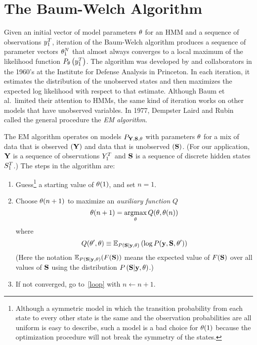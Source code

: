 \section{The Baum-Welch Algorithm}
\label{sec:baum_welch}

Given an initial vector of model parameters $\theta$ for an HMM
and a sequence of observations $y_{1}^{T}$, iteration of the
Baum-Welch algorithm  produces a
sequence of parameter vectors $\theta_{1}^{N}$ that almost
always converges to a local maximum of the likelihood function
$P_{\theta} \left( y_{1}^{T} \right)$.  The algorithm was
developed by  and collaborators \cite{Baum70,Baum67} in
the 1960's at the Institute for Defense Analysis in Princeton.  In
each iteration, it estimates the distribution of the unobserved states
and then maximizes the expected log likelihood with respect to that
estimate.  Although Baum et al.\ limited their attention to HMMs, the
same kind of iteration works on other models that have unobserved
variables.  In 1977, Dempster Laird and Rubin \cite{Dempster77} called
the general procedure the \emph{EM algorithm}.  %
%

The EM algorithm operates on models $P_{{\bf Y},{\bf S},\theta} $ with
parameters $\theta$ for a mix of data that is observed $({\bf Y})$ and
data that is unobserved $({\bf S})$.  (For our application, ${\bf Y}$ is a
sequence of observations $Y_{1}^{T}$ and ${\bf S}$ is a sequence of
discrete hidden states $S_{1}^{T}$.)  The steps in the algorithm
are:
\begin{enumerate}
\item Guess\footnote{Although a symmetric model in which the
    transition probability from each state to every other state is the
    same and the observation probabilities are all uniform is easy to
    describe, such a model is a bad choice for ${\theta}{(1)}$
    because the optimization procedure will not break the symmetry of
    the states.}  a starting value of ${\theta}{(1)}$, and set
  $n=1$.
\item \label{EM_loop} Choose ${\theta}{(n+1)}$ to maximize
  an \emph{auxiliary function} $Q$
  \begin{equation}
    \label{eq:EMmax}
    {\theta}{(n+1)} = \operatorname*{argmax}_{\theta} Q(\theta,{\theta}{(n)})
  \end{equation}
  where
  \begin{equation}
    \label{eq:Qdef}
    Q(\theta',\theta) \equiv \mathbb{E}_{P \left({\bf S}|\mathbf{y},\theta \right)}
    \left( \log P(\mathbf{y},{\bf S},\theta') \right)
  \end{equation}
  (Here the notation $\mathbb{E}_{P \left({\bf S}|\mathbf{y},\theta
    \right)}(F({\bf S}))$ means the expected value of $F({\bf S})$ over all
  values of ${\bf S}$ using the distribution $P \left({\bf S}|\mathbf{y},\theta
  \right)$.)%
\item If not converged, go to~\ref{loop} with $n \leftarrow n+1.$
\end{enumerate}

